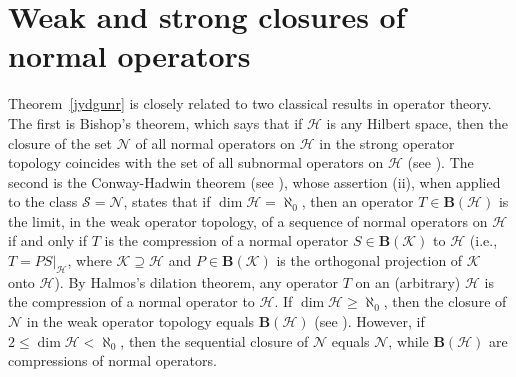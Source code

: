 \documentclass[reqno]{amsproc}
\numberwithin{equation}{section}
\theoremstyle{remark}
\newcommand*{\hh}{\mathcal{H}}
\newcommand*{\kk}{\mathcal{K}}
\theoremstyle{definition}
\newcommand*{\Le}{\leqslant}
\newcommand*{\Ge}{\geqslant}
\newcommand*{\ogr}{\boldsymbol{B}}
\begin{document}
   \section{\label{AppC}Weak and strong closures of normal operators}
Theorem~\ref{jydgunr} is closely related to two
classical results in operator theory. The first is
Bishop's theorem, which says that if $\hh$ is any
Hilbert space, then the closure of the set
$\mathscr{N}$ of all normal operators on $\hh$ in the
strong operator topology coincides with the set of all
subnormal operators on $\hh$ (see
\cite[Theorem~II.1.17]{Con91}). The second is the
Conway-Hadwin theorem (see \cite[Theorem]{CoHad83}),
whose assertion (ii), when applied to the class
$\mathscr{S}=\mathscr{N}$, states that if $\dim
\hh=\aleph_0$, then an operator $T\in \ogr(\hh)$ is
the limit, in the weak operator topology, of a
sequence of normal operators on $\hh$ if and only if
$T$ is the compression of a normal operator $S\in
\ogr(\kk)$ to $\hh$ (i.e., $T=P S|_{\hh}$, where $\kk
\supseteq \hh$ and $P\in \ogr(\kk)$ is the orthogonal
projection of $\kk$ onto $\hh$). By Halmos's dilation
theorem, any operator $T$ on an (arbitrary) $\hh$ is
the compression of a normal operator to $\hh$. If
$\dim \hh \Ge \aleph_0$, then the closure of
$\mathscr{N}$ in the weak operator topology equals
$\ogr(\hh)$ (see \cite[Problem~224]{Hal82}). However,
if $2 \Le \dim \hh < \aleph_0$, then the sequential
closure of $\mathscr{N}$ equals $\mathscr{N}$, while
$\ogr(\hh)$ are compressions of normal operators.
   
\end{document}

